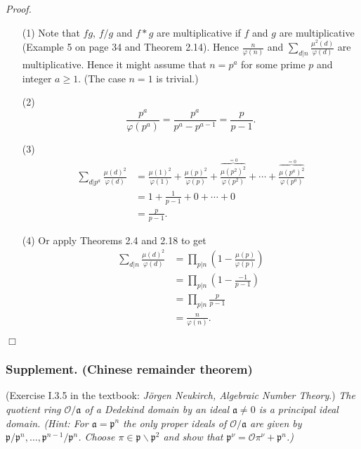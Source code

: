 \documentclass{article}
\begin{document}
\emph{Proof.}
\begin{enumerate}
\item[(1)]
  Note that $fg$, $f/g$ and $f * g$ are multiplicative if $f$ and $g$ are multiplicative
  (Example 5 on page 34 and Theorem 2.14).
  Hence $\frac{n}{\varphi(n)}$ and $\sum_{d|n} \frac{\mu^2(d)}{\varphi(d)}$
  are multiplicative.
  Hence it might assume that $n = p^a$ for some prime $p$ and integer $a \geq 1$.
  (The case $n=1$ is trivial.)

\item[(2)]
  \[
    \frac{p^a}{\varphi(p^a)}
    = \frac{p^a}{p^a - p^{a-1}}
    = \frac{p}{p-1}.
  \]

\item[(3)]
  \begin{align*}
    \sum_{d|p^a} \frac{\mu(d)^2}{\varphi(d)}
    &= \frac{\mu(1)^2}{\varphi(1)} + \frac{\mu(p)^2}{\varphi(p)}
      + \frac{\overbrace{\mu(p^2)^2}^{= 0}}{\varphi(p^2)} + \cdots
      + \frac{\overbrace{\mu(p^a)^2}^{=0}}{\varphi(p^a)} \\
    &= 1 + \frac{1}{p-1} + 0 + \cdots + 0 \\
    &= \frac{p}{p-1}.
  \end{align*}

\item[(4)]
  Or apply Theorems 2.4 and 2.18 to get
  \begin{align*}
    \sum_{d|n} \frac{\mu(d)^2}{\varphi(d)}
    &= \prod_{p|n} \left(1 - \frac{\mu(p)}{\varphi(p)} \right) \\
    &= \prod_{p|n} \left(1 - \frac{-1}{p-1} \right) \\
    &= \prod_{p|n} \frac{p}{p-1} \\
    &= \frac{n}{\varphi(n)}.
  \end{align*}
\end{enumerate}
$\Box$ \\



\subsubsection*{Supplement. (Chinese remainder theorem)}
(Exercise I.3.5 in the textbook: \emph{J\"orgen Neukirch, Algebraic Number Theory}.)
\emph{The quotient ring $\mathcal{O}/\mathfrak{a}$ of a Dedekind domain by
an ideal $\mathfrak{a} \neq 0$ is a principal ideal domain.
(Hint: For $\mathfrak{a} = \mathfrak{p}^n$ the only proper ideals of $\mathcal{O}/\mathfrak{a}$
are given by $\mathfrak{p}/\mathfrak{p}^n, \ldots, \mathfrak{p}^{n-1}/\mathfrak{p}^n$.
Choose $\pi \in \mathfrak{p} \smallsetminus \mathfrak{p}^2$
and show that $\mathfrak{p}^{\nu} = \mathcal{O}\pi^{\nu} + \mathfrak{p}^n$.)} \\
\end{document}
